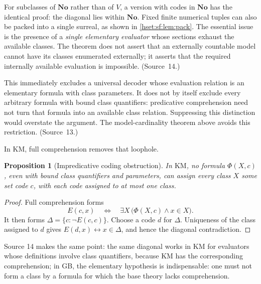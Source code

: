 \documentclass[11pt,letterpaper]{article}
\newtheorem{proposition}[proposition]{Proposition}\aliascntresetthe{proposition}
\theoremstyle{definition}
\theoremstyle{remark}
\newcommand{\No}{\mathbf{No}}
\newcommand{\KM}{\mathrm{KM}}
\begin{document}
For subclasses of $\No$ rather than of $V$, a version with codes in $\No$ has the
identical proof: the diagonal lies within $\No$. Fixed finite numerical tuples can
also be packed into a single surreal, as shown in \cref{hset:sf:lem:pack}. The
essential issue is the presence of a \emph{single elementary evaluator} whose
sections exhaust the available classes. The theorem does not assert that an
externally countable model cannot have its classes enumerated externally; it
asserts that the required internally available evaluation is impossible.
(Source~14.)

This immediately excludes a universal decoder whose evaluation relation is an
elementary formula with class parameters. It does not by itself exclude every
arbitrary formula with bound class quantifiers: predicative comprehension need not
turn that formula into an available class relation. Suppressing this distinction
would overstate the argument. The model-cardinality theorem above avoids this
restriction. (Source~13.)

In $\KM$, full comprehension removes that loophole.

\begin{proposition}[Impredicative coding obstruction]\label{hset:sf:prop:KMdiagonal}
In $\KM$, no formula $\Phi(X,c)$, even with bound class quantifiers and parameters,
can assign every class $X$ some set code $c$, with each code assigned to at most
one class.
\end{proposition}
\begin{proof}
Full comprehension forms
\[
 E(c,x)\quad\Longleftrightarrow\quad\exists X\,\bigl(\Phi(X,c)\land x\in X\bigr).
\]
It then forms $\Delta=\{c:\neg E(c,c)\}$. Choose a code $d$ for $\Delta$.
Uniqueness of the class assigned to $d$ gives $E(d,x)\leftrightarrow x\in \Delta$,
and hence the diagonal contradiction.
\end{proof}

Source 14 makes the same point: the same diagonal works in KM for evaluators whose
definitions involve class quantifiers, because KM has the corresponding
comprehension; in GB, the elementary hypothesis is indispensable: one must not form
a class by a formula for which the base theory lacks comprehension.
\end{document}
